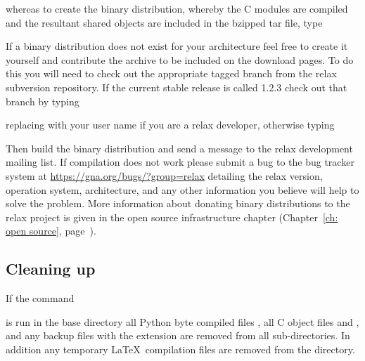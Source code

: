 
whereas to create the binary distribution, whereby the C modules are compiled and the resultant shared objects are included in the bzipped tar file, type


If a binary distribution does not exist for your architecture feel free to create it yourself and contribute the archive to be included on the download pages.
To do this you will need to check out the appropriate tagged branch from the relax subversion repository.
If the current stable release is called 1.2.3 check out that branch by typing


replacing  with your user name if you are a relax developer, otherwise typing


Then build the binary distribution and send a message to the relax development mailing list.
If compilation does not work please submit a bug to the bug tracker system at \href{https://gna.org/bugs/?group=relax}{https://gna.org/bugs/?group=relax} detailing the relax version, operation system, architecture, and any other information you believe will help to solve the problem.
More information about donating binary distributions to the relax project is given in the open source infrastructure chapter (Chapter~\ref{ch: open source}, page~\pageref{ch: open source}).



\subsection{Cleaning up}

If the command


is run in the base directory all Python byte compiled files , all C object files  and , and any backup files with the extension  are removed from all sub-directories.
In addition any temporary \LaTeX\ compilation files are removed from the  directory.

